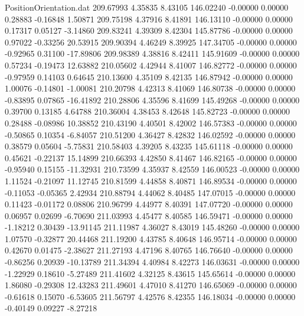 \begin{filecontents}{PositionOrientation.dat}
 209.67993    4.35835    8.43105   146.02240   -0.00000    0.00000    0.28883   -0.16848    1.50871
 209.75198    4.37916    8.41891   146.13110   -0.00000    0.00000    0.17317    0.05127   -3.14860
 209.83241    4.39309    8.42304   145.87786   -0.00000    0.00000    0.97022   -0.33256   20.53915
 209.90394    4.46249    8.39925   147.34705   -0.00000    0.00000   -0.92965    0.31100  -17.89806
 209.98389    4.38816    8.42411   145.91609   -0.00000    0.00000    0.57234   -0.19473   12.63882
 210.05602    4.42944    8.41007   146.82772   -0.00000    0.00000   -0.97959    0.14103    0.64645
 210.13600    4.35109    8.42135   146.87942   -0.00000    0.00000    1.00076   -0.14801   -1.00081
 210.20798    4.42313    8.41069   146.80738   -0.00000    0.00000   -0.83895    0.07865  -16.41892
 210.28806    4.35596    8.41699   145.49268   -0.00000    0.00000    0.39700    0.13185    4.64788
 210.36004    4.38453    8.42648   145.82723   -0.00000    0.00000    0.28488   -0.08986   10.38852
 210.43190    4.40501    8.42002   146.57383   -0.00000    0.00000   -0.50865    0.10354   -6.84057
 210.51200    4.36427    8.42832   146.02592   -0.00000    0.00000    0.38579    0.05604   -5.75831
 210.58403    4.39205    8.43235   145.61118   -0.00000    0.00000    0.45621   -0.22137   15.14899
 210.66393    4.42850    8.41467   146.82165   -0.00000    0.00000   -0.95940    0.15155  -11.32931
 210.73599    4.35937    8.42559   146.00523   -0.00000    0.00000    1.11524   -0.21097   11.12745
 210.81599    4.44858    8.40871   146.89534   -0.00000    0.00000   -0.11053   -0.05365    2.42934
 210.88794    4.44062    8.40485   147.07015   -0.00000    0.00000    0.11423   -0.01172    0.08806
 210.96799    4.44977    8.40391   147.07720   -0.00000    0.00000    0.06957    0.02699   -6.70690
 211.03993    4.45477    8.40585   146.59471   -0.00000    0.00000   -1.18212    0.30439  -13.91145
 211.11987    4.36027    8.43019   145.48260   -0.00000    0.00000    1.07570   -0.32877   20.44468
 211.19200    4.43785    8.40648   146.95714   -0.00000    0.00000    0.42670    0.01475   -2.38627
 211.27193    4.47196    8.40765   146.76640   -0.00000    0.00000   -0.86256    0.20939  -10.13789
 211.34394    4.40984    8.42273   146.03631   -0.00000    0.00000   -1.22929    0.18610   -5.27489
 211.41602    4.32125    8.43615   145.65614   -0.00000    0.00000    1.86080   -0.29308   12.43283
 211.49601    4.47010    8.41270   146.65069   -0.00000    0.00000   -0.61618    0.15070   -6.53605
 211.56797    4.42576    8.42355   146.18034   -0.00000    0.00000   -0.40149    0.09227   -8.27218

\end{filecontents}
